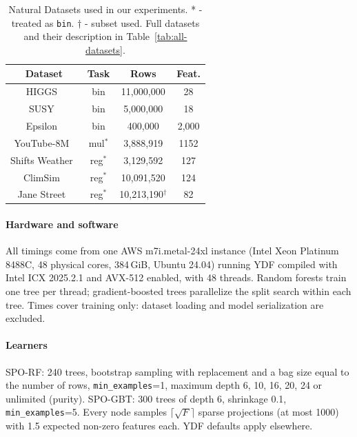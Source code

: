 \documentclass[sigconf,anonymous,review]{acmart}
\newcommand{\code}[1]{\texttt{\small #1}}
\begin{document}
\begin{table}[]
    \centering
    \begin{tabular}{c|c|c|c}
Dataset & Task & Rows & Feat. \\
\midrule
HIGGS~\cite{higgs_280} & bin & 11,000,000 & 28 \\
SUSY~\cite{susy_279} & bin & 5,000,000 & 18 \\
Epsilon~\cite{chang2011libsvm} & bin & 400,000 & 2,000 \\
YouTube-8M~\cite{abu2016youtube}         & mul$^*$   & 3,888,919            & 1152 \\
Shifts Weather~\cite{malinin2021shifts}   & reg$^*$   & 3,129,592            & 127 \\
ClimSim~\cite{yu2023climsim}              & reg$^*$   & 10,091,520           & 124 \\
Jane Street~\cite{jane-street-real-time-market-data-forecasting}       & reg$^*$   & 10,213,190$^\dagger$ & 82
\end{tabular}
\caption{Natural Datasets used in our experiments. * - treated as \texttt{bin}. $\dagger$ - subset used. Full datasets and their description in Table~\ref{tab:all-datasets}.}
\label{tab:natural-datasets}
\end{table}

\paragraph{Hardware and software} All timings come from one AWS m7i.metal-24xl instance (Intel Xeon Platinum 8488C, 48 physical cores, 384\,GiB, Ubuntu 24.04) running YDF compiled with Intel ICX 2025.2.1 and AVX-512 enabled, with 48 threads. Random forests train one tree per thread; gradient-boosted trees parallelize the split search within each tree. Times cover training only: dataset loading and model serialization are excluded.

\paragraph{Learners} SPO-RF: 240 trees, bootstrap sampling with replacement and a bag size equal to the number of rows, \code{min\_examples}=1, maximum depth 6, 10, 16, 20, 24 or unlimited (purity). SPO-GBT: 300 trees of depth 6, shrinkage 0.1, \code{min\_examples}=5. Every node samples $\lceil\sqrt{F}\rceil$ sparse projections (at most 1000) with 1.5 expected non-zero features each. YDF defaults apply elsewhere.
\end{document}
